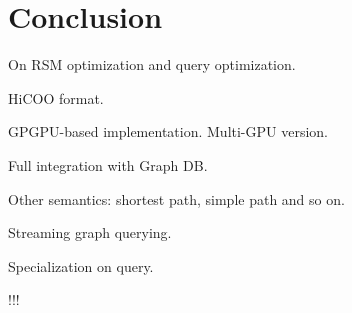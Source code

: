 \section{Conclusion}

On RSM optimization and query optimization.

HiCOO format.

GPGPU-based implementation. Multi-GPU version. 

Full integration with Graph DB.

Other semantics: shortest path, simple path and so on.

Streaming graph querying.

Specialization on query.

!!!